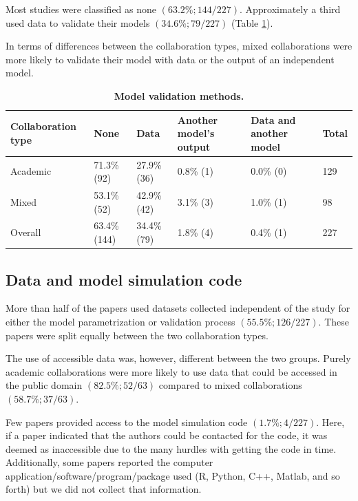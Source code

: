 \documentclass[10pt,letterpaper]{article}
\begin{document}
Most studies were classified as none $(63.2\%; 144/227)$. Approximately a third used data to validate their models $(34.6\%; 79/227)$ (Table \ref{model_validation_results}). 

In terms of differences between the collaboration types, mixed collaborations were more likely to validate their model with data or the output of an independent model. 

\begin{table}[!h]
	\centering
	\setlength\arrayrulewidth{1pt} 
	\caption{\bf Model validation methods.}
	\begin{adjustwidth}{-0.00in}{0in}
		\begin{tabular}{| p{}  p{} p{} p{} p{} p{}|}
			\hline
			\textbf{Collaboration type} & \textbf{None} & \textbf{Data} & \textbf{Another model's output} & \textbf{Data and another model} & \textbf{Total} \\ \hline
			Academic & 71.3\% (92) & 27.9\% (36) & 0.8\% (1) & 0.0\% (0) & 129 \\ \hline
			Mixed & 53.1\% (52) & 42.9\% (42) & 3.1\% (3) & 1.0\% (1) & 98 \\ \hline \rowcolor{gray!20}
			Overall & 63.4\% (144) & 34.4\% (79) & 1.8\% (4) & 0.4\% (1) & 227\\ \hline
		\end{tabular}
	\end{adjustwidth}
	\label{model_validation_results}
\end{table}


\subsection*{Data and model simulation code}
More than half of the papers used datasets collected independent of the study for either the model parametrization or validation process $(55.5\%; 126/227)$. These papers were split equally between the two collaboration types. 

The use of accessible data was, however, different between the two groups. Purely academic collaborations were more likely to use data that could be accessed in the public domain $(82.5\%; 52/63)$ compared to mixed collaborations $(58.7\%; 37/63)$.  

Few papers provided access to the model simulation code $(1.7\%; 4/227)$. Here, if a paper indicated that the authors could be contacted for the code, it was deemed as inaccessible due to the many hurdles with getting the code in time. Additionally, some papers reported the computer application/software/program/package used (R, Python, C++, Matlab, and so forth) but we did not collect that information. 
\end{document}
